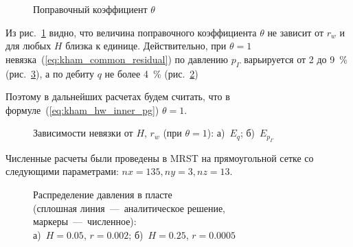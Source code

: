 \documentclass{article}
\begin{document}
\begin{figure}[H]
	\centering
	
	\caption{Поправочный коэффициент $\theta$}
	\label{fig:kham_hw_inner_theta_map_mrst}
\end{figure}

Из рис.~\ref{fig:kham_hw_inner_theta_map_mrst} видно, что величина поправочного коэффициента
$\theta$ не зависит от $r_w$ и для любых $H$ близка к единице.
Действительно, при $\theta=1$ невязка~(\ref{eq:kham_common_residual}) по давлению
$p_{\Gamma}$ варьируется от 2 до 9~\% (рис.~\ref{fig:kham_hw_inner_epg_map_mrst}), а по
дебиту $q$ не более 4~\% (рис.~\ref{fig:kham_hw_inner_eq_map_mrst})

Поэтому в дальнейших расчетах будем считать, что в формуле~(\ref{eq:kham_hw_inner_pg}) $\theta=1$.

\begin{figure}[H]
	\centering
	\begin{subfigure}{0.48\textwidth}
		\centering
		
		\caption{}
		\label{fig:kham_hw_inner_eq_map_mrst}
	\end{subfigure}
	\hfill
	\begin{subfigure}{0.48\textwidth}
		\centering
		
		\caption{}
		\label{fig:kham_hw_inner_epg_map_mrst}
	\end{subfigure}
	\caption{
		Зависимости невязки от $H$, $r_w$ (при $\theta=1$):
		а)~$E_q$;
		б)~$E_{p_{\Gamma}}$
	}
	\label{fig:kham_hw_inner_eq_epg_maps}
\end{figure}

Численные расчеты были проведены в MRST на прямоугольной сетке со следующими параметрами: $nx=  135, ny = 3, nz = 13$.

\begin{figure}[H]
	\centering
	\begin{subfigure}{0.48\textwidth}
		\centering
		
		\caption{}
		\label{fig:kham_hw_inner_p_worst_pg}
	\end{subfigure}
	\hfill
	\begin{subfigure}{0.48\textwidth}
		\centering
		
		\caption{}
		\label{fig:kham_hw_inner_p_best_pg}
	\end{subfigure}
	\caption{
		Распределение давления в пласте \\
		(сплошная линия~---~аналитическое решение, маркеры~---~численное): \\
		а)~$H = 0.05$, $r = 0.002$;
		б)~$H = 0.25$, $r = 0.0005$
	}
	\label{fig:kham_hw_inner_press_disrt}
\end{figure}
\end{document}

